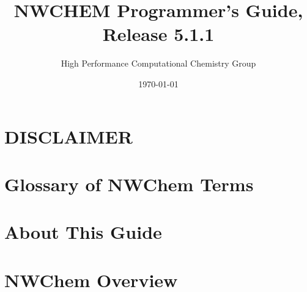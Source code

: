 \setlength{\parskip}{6pt}

\newcommand{\TRUE}{\verb+.true.+}
\newcommand{\FALSE}{\verb+.false.+}
\newcommand{\nwchemversion}{5.1.1}
\newcommand{\nwchemyear}{2008}



\title{\bf\Large NWCHEM Programmer's Guide, Release \nwchemversion}
\author{High Performance Computational Chemistry Group}
\date{\today}
\maketitle

\chapter*{\center DISCLAIMER}


\chapter*{Glossary of NWChem Terms}


\chapter*{About This Guide}


\clearpage

\tableofcontents

\clearpage

\chapter{NWChem Overview}




